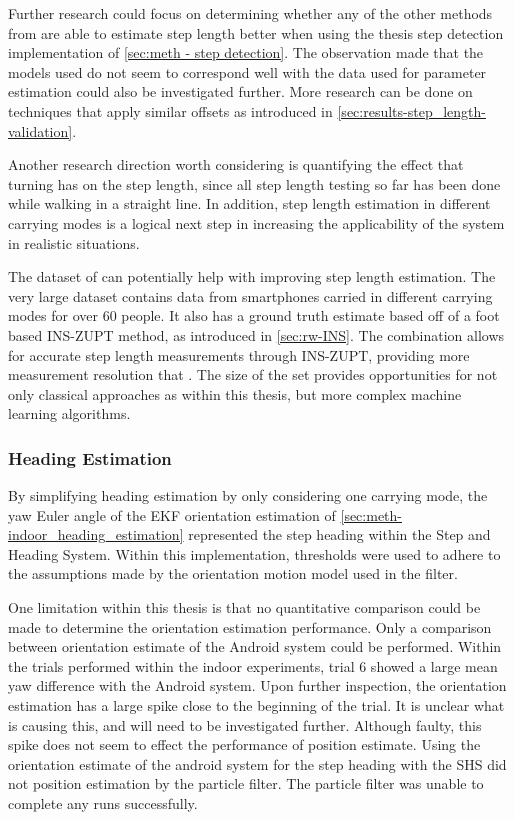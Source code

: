 Further research could focus on determining whether any of the other methods from \cite{Vezocnik2019} are able to estimate step length better when using the thesis step detection implementation of \cref{sec:meth - step detection}. The observation made that the models used do not seem to correspond well with the data used for parameter estimation could also be investigated further. More research can be done on techniques that apply similar offsets as introduced in \cref{sec:results-step_length-validation}. \par 

Another research direction worth considering is quantifying the effect that turning has on the step length, since all step length testing so far has been done while walking in a straight line. In addition, step length estimation in different carrying modes is a logical next step in increasing the applicability of the system in realistic situations. \par

The dataset of \citet{Bayev2019} can potentially help with improving step length estimation. The very large dataset contains data from smartphones carried in different carrying modes for over 60 people. It also has a ground truth estimate based off of a foot based INS-ZUPT method, as introduced in \cref{sec:rw-INS}. The combination allows for accurate step length measurements through INS-ZUPT, providing more measurement resolution that \cite{Vezocnik2019}. The size of the set provides opportunities for not only classical approaches as within this thesis, but more complex machine learning algorithms.\par

\subsubsection{Heading Estimation}

By simplifying heading estimation by only considering one carrying mode, the yaw Euler angle of the EKF orientation estimation of \cref{sec:meth-indoor_heading_estimation} represented the step heading within the Step and Heading System. Within this implementation, thresholds were used to adhere to the assumptions made by the orientation motion model used in the filter. \par 

One limitation within this thesis is that no quantitative comparison could be made to determine the orientation estimation performance. Only a comparison between orientation estimate of the Android system could be performed. Within the trials performed within the indoor experiments, trial 6 showed a large mean yaw difference with the Android system. Upon further inspection, the orientation estimation has a large spike close to the beginning of the trial. It is unclear what is causing this, and will need to be investigated further. Although faulty, this spike does not seem to effect the performance of position estimate. Using the orientation estimate of the android system for the step heading with the SHS did not position estimation by the particle filter. The particle filter was unable to complete any runs successfully. \par 

